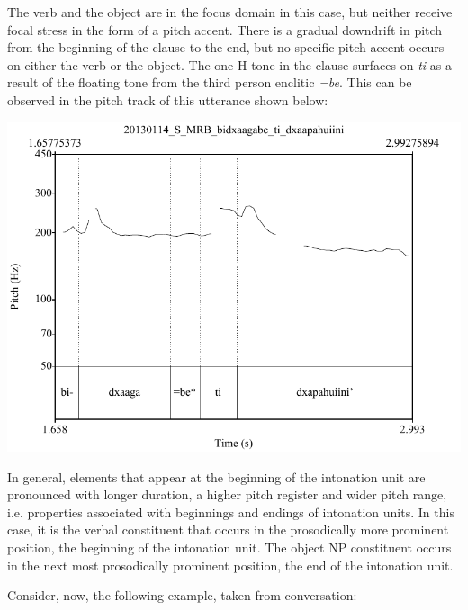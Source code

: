 The verb and the object are in the focus domain in this case, but neither receive focal stress in the form of a pitch accent. There is a gradual downdrift in pitch from the beginning of the clause to the end, but no specific pitch accent occurs on either the verb or the object. The one H tone in the clause surfaces on \textit{ti} as a result of the floating tone from the third person enclitic \textit{=be}. This can be observed in the pitch track of this utterance shown below:

\vspace{3mm}

\includegraphics[height=.4\textheight]{dxaapahuiini}

In general, elements that appear at the beginning of the intonation unit are pronounced with longer duration, a higher pitch register and wider pitch range, i.e. properties associated with beginnings and endings of intonation units. In this case, it is the verbal constituent that occurs in the prosodically more prominent position, the beginning of the intonation unit. The object NP constituent occurs in the next most prosodically prominent position, the end of the intonation unit.

Consider, now, the following example, taken from conversation:

